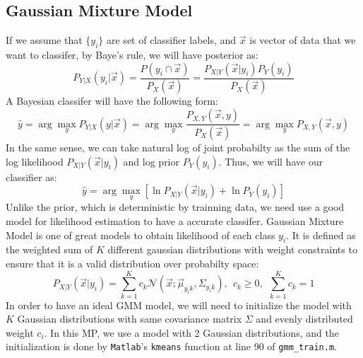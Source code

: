 \documentclass{article}
\begin{document}
	\subsection{Gaussian Mixture Model}
	If we assume that $\{y_i\}$ are set of classifier labels, and $\vec{x}$ is vector of data that we want to classifer, by Baye's rule, we will have posterior as:
	$$P_{Y|X}(y_i|\vec{x})=\frac{P(y_i\cap \vec{x})}{P_X(\vec{x})}=\frac{P_{X|Y}(\vec{x}|y_i)P_Y(y_i)}{P_X(\vec{x})}$$ 
	A Bayesian classifer will have the following form:
	$$\hat{y}=\arg\max_y P_{Y|X}(y|\vec{x})=\arg\max_y\frac{P_{X,Y}(\vec{x},y)}{P_X(\vec{x})}=\arg\max_y P_{X,Y}(\vec{x},y)$$
	In the same sense, we can take natural log of joint probabilty as the sum of the log likelihood $P_{X|Y}(\vec{x}|y_i)$ and log prior $P_Y(y_i)$. Thus, we will have our classifier as:
	$$\hat{y}=\arg\max_y[\ln P_{X|Y}(\vec{x}|y_i)+\ln P_Y(y_i)]$$
	Unlike the prior, which is deterministic by trainning data, we need use a good model for likelihood estimation to have a accurate classifer. Gaussian Mixture Model is one of great models to obtain likelihood of each class $y_i$. It is defined as the weighted sum of $K$ different gaussian distributions with weight constraints to ensure that it is a valid distribution over probabilty space:
	$$P_{X|Y}(\vec{x}|y_i) = \sum_{k=1}^K c_k {\mathcal N}(\vec{x};\vec\mu_{y_ik},\Sigma_{y_ik}),~~c_k\geq0,~~\sum_{k=1}^K c_k = 1$$
	In order to have an ideal GMM model, we will need to initialize the model with $K$ Gaussian distributions with same covariance matrix $\Sigma$ and evenly distributed weight $c_i$. In this MP, we use a model with 2 Gaussian distributions, and the initialization is done by \texttt{Matlab}'s \texttt{kmeans} function at line 90 of \texttt{gmm\_train.m}.
\end{document}
